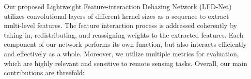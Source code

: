 \documentclass[lettersize,journal]{IEEEtran}
\begin{document}


Our proposed Lightweight Feature-interaction Dehazing Network (LFD-Net) utilizes convolutional layers of different kernel sizes as a sequence to extract multi-level features. The feature interaction process is addressed coherently by taking in, redistributing, and reassigning weights to the extracted features. Each component of our network performs its own function, but also interacts efficiently and effectively as a whole. Moreover, we utilize multiple metrics for evaluation, which are highly relevant and sensitive to remote sensing tasks. Overall, our main contributions are threefold:
\end{document}
